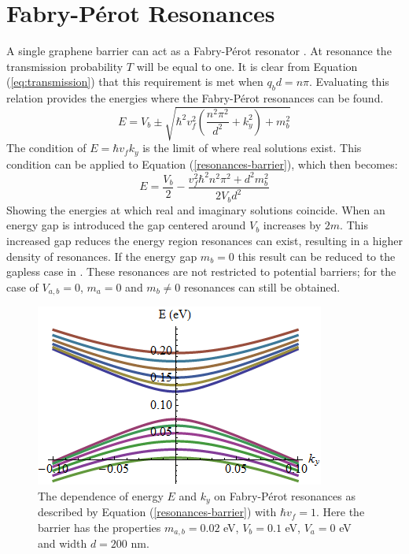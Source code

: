 \documentclass[12pt,a4paper]{report}
\begin{document}
			\section{Fabry-P\'{e}rot Resonances}
			\label{Rectangular Barrier - Fabry-Perot Resonances}
				A single graphene barrier can act as a Fabry-P\'{e}rot resonator \cite{b38}. At resonance the transmission probability $T$ will be equal to one. It is clear from Equation (\ref{eq:transmission}) that this requirement is met when $q_{b}d=n\pi$. Evaluating this relation provides the energies where the Fabry-P\'{e}rot resonances can be found.
				\begin{equation}
					E=V_{b}\pm\sqrt{\hbar^{2}v_{f}^{2}\left(\frac{n^{2}\pi^{2}}{d^{2}}+k_{y}^{2}\right)+m_{b}^{2}}
					\label{resonances-barrier}
				\end{equation}
				The condition of $E=\hbar v_{f}k_{y}$ is the limit of where real solutions exist. This condition can be applied to Equation (\ref{resonances-barrier}), which then becomes:
				\begin{equation}
					E=\frac{V_{b}}{2}-\frac{v_{f}^{2}\hbar^{2}n^{2}\pi^{2}+d^{2}m_{b}^{2}}{2V_{b}d^{2}}
				\end{equation}
	Showing the energies at which real and imaginary solutions coincide. When an energy gap is introduced the gap centered around $V_{b}$ increases by $2m$. This increased gap reduces the energy region resonances can exist, resulting in a higher density of resonances. If the energy gap $m_{b}=0$ this result can be reduced to the gapless case in \cite{b14}. These resonances are not restricted to potential barriers; for the case of $V_{a,b}=0$, $m_{a}=0$ and $m_{b} \neq 0$ resonances can still be obtained.
\begin{figure}
	\centerline{\includegraphics[scale=0.5]{images/mass-potential-energy-levels}}
	\label{}
	\caption{The dependence of energy $E$ and $k_{y}$ on Fabry-P\'{e}rot resonances as described by Equation (\ref{resonances-barrier}) with $\hbar v_{f}=1$. Here the barrier has the properties $m_{a,b}=0.02$ eV, $V_{b}=0.1$ eV, $V_{a}=0$ eV and width $d=200$ nm.}
\end{figure}
\end{document}

